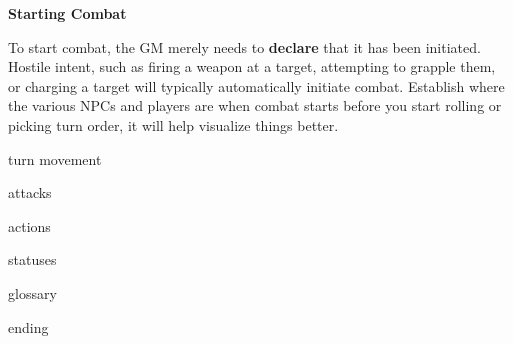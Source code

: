 \begin{center}
    \textbf{Starting Combat}
\end{center}

To start combat, the GM merely needs to \textbf{declare} that it has been initiated. Hostile intent, such as firing a weapon at a target, attempting to grapple them, or charging a target will typically automatically initiate combat. Establish where the various NPCs and players are when combat starts before you start rolling or picking turn order, it will help visualize things better.

{turn}
\newpage
{movement}

{attacks}

{actions}

{statuses}

{glossary}

{ending}
